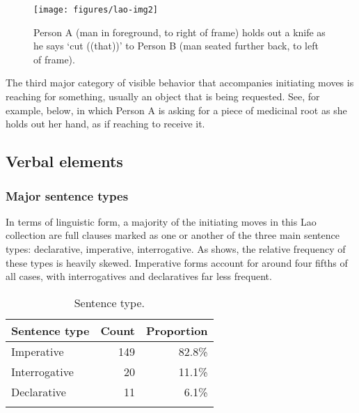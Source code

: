 \documentclass[output=paper]{langsci/langscibook}
\begin{document}
\begin{figure}
\caption{Person A (man in foreground, to right of frame) holds out a knife as he says ‘cut ((that))’ to Person B (man seated further back, to left of frame).}
\label{fig:enfield:5}
\texttt{[image: figures/lao-img2]}



\end{figure}


The third major category of visible behavior that accompanies initiating moves is reaching for something, usually an object that is being requested. See, for example,  below, in which Person A is asking for a piece of medicinal root as she holds out her hand, as if reaching to receive it. %

\subsection{Verbal elements}

\subsubsection{Major sentence types}\label{sec:enfield:4.3.1}

In terms of linguistic form, a majority of the initiating moves in this Lao collection are full clauses marked as one or another of the three main sentence types: declarative, imperative, interrogative. As  shows, the relative frequency of these types is heavily skewed. Imperative forms account for around four fifths of all cases, with interrogatives and declaratives far less frequent.

\begin{table}
\begin{tabularx}{0.66\textwidth}{Xrr}
\lsptoprule
Sentence type & Count & Proportion\\
\midrule
Imperative & 149 & 82.8\%\\
Interrogative & 20 & 11.1\%\\
Declarative & 11 & 6.1\%\\
\lspbottomrule
\end{tabularx}
\caption{Sentence type.}
\label{tab:enfield:4}
\end{table}
\end{document}
